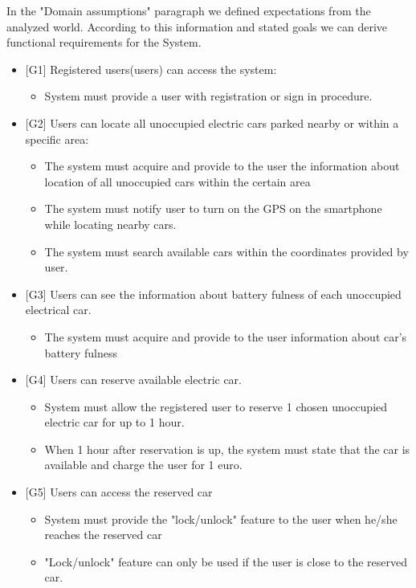 \documentclass[12pt, letterpaper]{article}
\begin{document}
In the "Domain assumptions" paragraph we defined expectations from the analyzed
world. According to this information and stated goals we can derive functional requirements
for the System.
\begin{itemize}
	\item {[G1]} Registered users(users) can access the system:
		\begin{itemize}
		\item System must provide a user with registration or sign in procedure.
		\end{itemize}
	\item {[G2]} Users can locate all unoccupied electric cars parked nearby or within
	a specific area:
	\begin{itemize}
		\item The system must acquire and provide to the user the information about location of all
		unoccupied cars within the certain area
		\item The system must notify user to turn on the GPS on the smartphone while locating
		nearby cars.
		\item The system must search available cars within the coordinates provided by user.
	\end{itemize}
	\item {[G3]} Users can see the information about battery fulness of each
	unoccupied electrical car.
	\begin{itemize}
		\item The system must acquire and provide to the user information about car’s battery
		fulness
	\end{itemize}
	\item {[G4]} Users can reserve available electric car.
	\begin{itemize}
		\item System must allow the registered user to reserve 1 chosen unoccupied electric car for
		up to 1 hour.
		\item When 1 hour after reservation is up, the system must state that the car is available and
		charge the user for 1 euro.
	\end{itemize}
	\item {[G5]} Users can access the reserved car
	\begin{itemize}
		\item System must provide the "lock/unlock" feature to the user when he/she reaches the
		reserved car
		\item "Lock/unlock" feature can only be used if the user is close to the reserved car.

\end{itemize}
\end{itemize}
\end{document}
